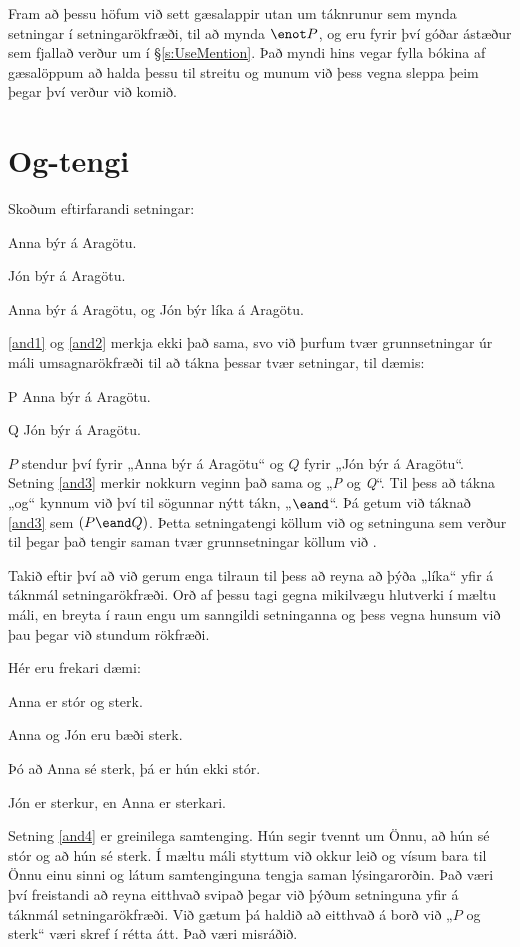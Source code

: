 Fram að þessu höfum við sett gæsalappir utan um táknrunur sem mynda setningar í setningarökfræði, til að mynda $\enot P$, og eru fyrir því góðar ástæður sem fjallað verður um í \S\ref{s:UseMention}. Það myndi hins vegar fylla bókina af gæsalöppum að halda þessu til streitu og munum við þess vegna sleppa þeim þegar því verður við komið.
	
\section{Og-tengi}\label{s:ConnectiveConjunction}
Skoðum eftirfarandi setningar:
	\begin{earg}
		\item[\ex{and1}]Anna býr á Aragötu.
		\item[\ex{and2}]Jón býr á Aragötu.
		\item[\ex{and3}]Anna býr á Aragötu, og Jón býr líka á Aragötu.
	\end{earg}
\ref{and1} og \ref{and2} merkja ekki það sama, svo við þurfum tvær grunnsetningar úr máli umsagnarökfræði til að tákna þessar tvær setningar, til dæmis:
	\begin{ekey}
		\item[P] Anna býr á Aragötu.
		\item[Q] Jón býr á Aragötu.
	\end{ekey}
$P$ stendur því fyrir „Anna býr á Aragötu“ og $Q$ fyrir „Jón býr á Aragötu“. Setning \ref{and3} merkir nokkurn veginn það sama og „\emph{P} og \emph{Q}“. Til þess að tákna „og“ kynnum við því til sögunnar nýtt tákn, „$\eand$“. Þá getum við táknað \ref{and3} sem $(P \eand Q)$. Þetta setningatengi köllum við  og setninguna sem verður til þegar það tengir saman tvær grunnsetningar köllum við .  

Takið eftir því að við gerum enga tilraun til þess að reyna að þýða „líka“ yfir á táknmál setningarökfræði. Orð af þessu tagi gegna mikilvægu hlutverki í mæltu máli, en breyta í raun engu um sanngildi setninganna og þess vegna hunsum við þau þegar við stundum rökfræði.

Hér eru frekari dæmi:
	\begin{earg}
		\item[\ex{and4}]Anna er stór og sterk.
		\item[\ex{and5}]Anna og Jón eru bæði sterk.
		\item[\ex{and6}]Þó að Anna sé sterk, þá er hún ekki stór.
	\item[\ex{and7}]Jón er sterkur, en Anna er sterkari.
	\end{earg}
Setning \ref{and4} er greinilega samtenging. Hún segir tvennt um Önnu, að hún sé stór og að hún sé sterk. Í mæltu máli styttum við okkur leið og vísum bara til Önnu einu sinni og látum samtenginguna tengja saman lýsingarorðin. Það væri því freistandi að reyna eitthvað svipað þegar við þýðum setninguna yfir á táknmál setningarökfræði. Við gætum þá haldið að eitthvað á borð við „$P$ og sterk“ væri skref í rétta átt. Það væri misráðið. 

